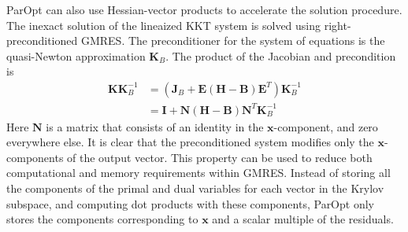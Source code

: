 \documentclass[12pt]{article}
\newcommand{\mb}{\mathbf}
\begin{document}
ParOpt can also use Hessian-vector products to accelerate the solution procedure.
The inexact solution of the lineaized KKT system is solved using right-preconditioned GMRES.
The preconditioner for the system of equations is the quasi-Newton approximation $\mb{K}_{B}$.
The product of the Jacobian and precondition is
%
\begin{equation}
  \begin{aligned}
    \mb{K}\mb{K}_{B}^{-1} & = \left(\mb{J}_{B} + 
    \mb{E}\left(\mb{H} - \mb{B}\right)\mb{E}^{T}\right)\mb{K}_{B}^{-1} \\
    & = \mb{I} + \mb{N} \left(\mb{H} - \mb{B} \right) \mb{N}^{T} \mb{K}_{B}^{-1}
  \end{aligned}
\end{equation}
Here $\mb{N}$ is a matrix that consists of an identity in the $\mb{x}$-component, and zero everywhere else.
It is clear that the preconditioned system modifies only the $\mb{x}$-components of the output vector.
This property can be used to reduce both computational and memory requirements within GMRES. 
Instead of storing all the components of the primal and dual variables for each vector in the Krylov subspace, and computing dot products with these components, ParOpt only stores the components corresponding to $\mb{x}$ and a scalar multiple of the residuals.




  
  
\end{document}
